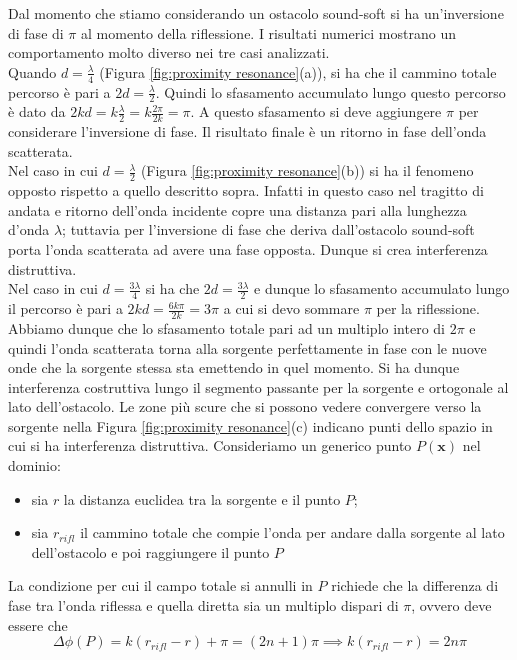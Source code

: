 \documentclass[a4paper,12pt]{article}
\theoremstyle{definition}
\begin{document}
Dal momento che stiamo considerando un ostacolo sound-soft si ha un'inversione di fase di $\pi$ al momento della riflessione.
I risultati numerici mostrano un comportamento molto diverso nei tre casi analizzati. \\
Quando $d= \frac{\lambda}{4}$ (Figura \ref{fig:proximity resonance}(a)), si ha che il cammino totale percorso è pari a $2d = \frac{\lambda}{2}$. Quindi lo sfasamento accumulato lungo questo percorso è dato da $2kd = k \frac{\lambda}{2} = k \frac{2\pi}{2k} = \pi $. A questo sfasamento si deve aggiungere $\pi$ per considerare l'inversione di fase. Il risultato finale è un ritorno in fase dell'onda scatterata.\\
Nel caso in cui $d= \frac{\lambda}{2}$ (Figura \ref{fig:proximity resonance}(b)) si ha il fenomeno opposto rispetto a quello descritto sopra. Infatti in questo caso nel tragitto di andata e ritorno dell'onda incidente copre una distanza pari alla lunghezza d'onda $\lambda$; tuttavia per l'inversione di fase che deriva dall'ostacolo sound-soft porta l'onda scatterata ad avere una fase opposta. Dunque si crea interferenza distruttiva. \\
Nel caso in cui $d= \frac{3\lambda}{4}$ si ha che $2d = \frac{3\lambda}{2}$ e dunque lo sfasamento accumulato lungo il percorso è pari a $2kd=\frac{6k\pi}{2k}=3\pi$ a cui si devo sommare $\pi$ per la riflessione. Abbiamo dunque che lo sfasamento totale pari ad un multiplo intero di $2\pi$ e quindi l'onda scatterata torna alla sorgente perfettamente in fase con le nuove onde che la sorgente stessa sta emettendo in quel momento. Si ha dunque interferenza costruttiva lungo il segmento passante per la sorgente e ortogonale al lato dell'ostacolo. Le zone più scure che si possono vedere convergere verso la sorgente nella Figura \ref{fig:proximity resonance}(c) indicano punti dello spazio in cui si ha interferenza distruttiva. Consideriamo un generico punto $P(\textbf{x})$ nel dominio:
\begin{itemize}
    \item sia $r$ la distanza euclidea tra la sorgente e il punto $P$;
    \item sia $r_{rifl}$ il cammino totale che compie l'onda per andare dalla sorgente al lato dell'ostacolo e poi raggiungere il punto $P$
\end{itemize}
La condizione per cui il campo totale si annulli in $P$ richiede che la differenza di fase tra l'onda riflessa e quella diretta sia un multiplo dispari di $\pi$, ovvero deve essere che
\begin{equation*}
    \Delta\phi(P) = k(r_{rifl} -r)+ \pi = (2n+1)\pi \implies k(r_{rifl} -r)= 2n\pi
\end{equation*}
\end{document}
